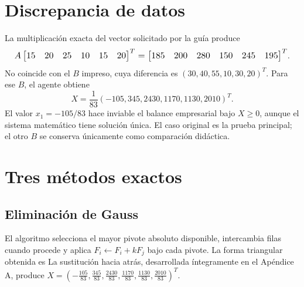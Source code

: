 \documentclass[conference]{IEEEtran}
\begin{document}
\section{Discrepancia de datos}
La multiplicación exacta del vector solicitado por la guía produce
\[
\resizebox{0.97\linewidth}{!}{\(A\begin{bmatrix}15&20&25&10&15&20\end{bmatrix}^T
=\begin{bmatrix}185&200&280&150&245&195\end{bmatrix}^T\)}.
\]
No coincide con el $B$ impreso, cuya diferencia es $(30,40,55,10,30,20)^T$. Para ese $B$, el agente obtiene
\[
X=\frac1{83}(-105,345,2430,1170,1130,2010)^T.
\]
El valor $x_1=-105/83$ hace inviable el balance empresarial bajo $X\ge0$, aunque el sistema matemático tiene solución única. El caso original es la prueba principal; el otro $B$ se conserva únicamente como comparación didáctica.

\section{Tres métodos exactos}
\subsection{Eliminación de Gauss}
El algoritmo selecciona el mayor pivote absoluto disponible, intercambia filas cuando procede y aplica $F_i\leftarrow F_i+kF_j$ bajo cada pivote. La forma triangular obtenida es
La sustitución hacia atrás, desarrollada íntegramente en el Apéndice A, produce $X=\left(-\frac{105}{83},\frac{345}{83},\frac{2430}{83},\frac{1170}{83},\frac{1130}{83},\frac{2010}{83}\right)^T$.
\end{document}
